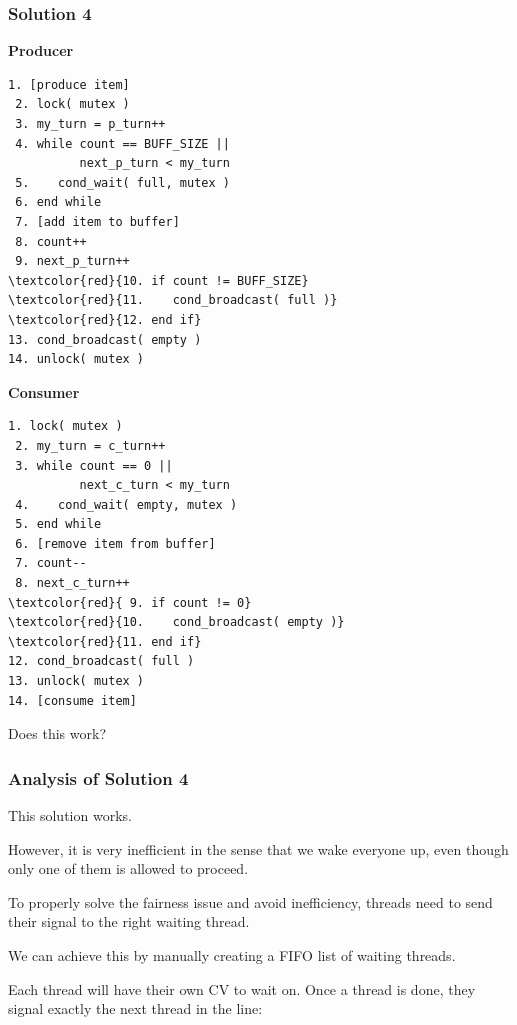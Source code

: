 \begin{frame}[fragile]
	\frametitle{Solution 4}

	\begin{multicols}{2}
		\small
		\textbf{Producer}
		\begin{Verbatim}[commandchars=\\\{\}]
 1. [produce item]
 2. lock( mutex )
 3. my_turn = p_turn++
 4. while count == BUFF_SIZE ||
          next_p_turn < my_turn
 5.    cond_wait( full, mutex )
 6. end while
 7. [add item to buffer]
 8. count++
 9. next_p_turn++
\textcolor{red}{10. if count != BUFF_SIZE}
\textcolor{red}{11.    cond_broadcast( full )}
\textcolor{red}{12. end if}
13. cond_broadcast( empty )
14. unlock( mutex )
    	\end{Verbatim}
		\columnbreak
		\textbf{Consumer}\vspace{-2em}
		\begin{Verbatim}[commandchars=\\\{\}]
 1. lock( mutex )
 2. my_turn = c_turn++
 3. while count == 0 ||
          next_c_turn < my_turn
 4.    cond_wait( empty, mutex )
 5. end while
 6. [remove item from buffer]
 7. count--
 8. next_c_turn++
\textcolor{red}{ 9. if count != 0}
\textcolor{red}{10.    cond_broadcast( empty )}
\textcolor{red}{11. end if}
12. cond_broadcast( full )
13. unlock( mutex )
14. [consume item]
		\end{Verbatim}
	\end{multicols}
	\vspace{-2em}

	Does this work?

\end{frame}

\begin{frame}
	\frametitle{Analysis of Solution 4}
	This solution works.

	However, it is very \alert{inefficient} in the sense that we wake everyone up, even though only one of them is allowed to proceed.

	To properly solve the fairness issue and avoid inefficiency, threads need to send their signal to the \alert{right} waiting thread.

	We can achieve this by manually creating a FIFO list of waiting threads.

	Each thread will have their own CV to wait on.
	Once a thread is done, they signal exactly the next thread in the line:
\end{frame}

